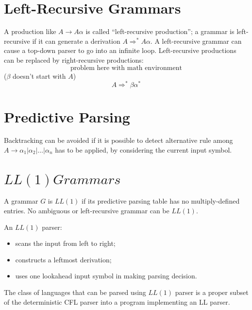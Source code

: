 \section{Left-Recursive Grammars}
A production like $A \to A\alpha$ is called ``left-recursive production''; a grammar is left-recursive if it can generate a derivation $A \Rightarrow^\ast A\alpha$.
A left-recursive grammar can cause a top-down parser to go into an infinite loop.
Left-recursive productions can be replaced by right-recursive productions:
$$
\text{problem here with math environment}
$$
($\beta$ doesn't start with $A$)
$$
	A \Rightarrow^\ast \beta\alpha^\ast
$$

\section{Predictive Parsing}
Backtracking can be avoided if it is possible to detect alternative rule among $A \to \alpha_1 | \alpha_2 | \ldots | \alpha_n$ has to be applied, by considering the current input symbol.

\section{$LL(1) Grammars$}
A grammar $G$ is $LL(1)$ if its predictive parsing table has no multiply-defined entries.
No ambiguous or left-recursive grammar can be $LL(1)$.

An $LL(1)$ parser:
\begin{itemize}
	\item scans the input from left to right;
	\item constructs a leftmost derivation;
	\item uses one lookahead input symbol in making parsing decision.
\end{itemize}

The class of languages that can be parsed using $LL(1)$ parser is a proper subset of the deterministic CFL parser into a program implementing an LL parser.